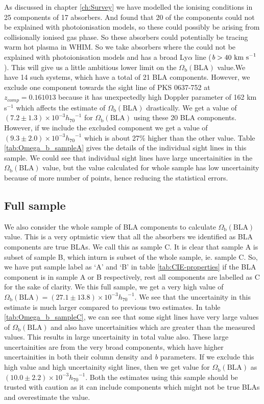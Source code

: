 As discussed in chapter \ref{ch:Survey} we have modelled the ionising conditions in 25 components of 17  absorbers. And found that 20 of the components could not be explained with photoionisation models, so these could possibly be arising from collisionally ionised gas phase. So these absorbers could potentially be tracing warm hot plasma in WHIM. So we take absorbers where the  could not be explained with photoionisation models and has a broad Ly$\alpha$ line ($\emph{b}>40 \ \text{km s}^{-1}$). This will give us a little ambitious lower limit on the $\Omega_\text{b}(\text{BLA})$ value.We have 14 such systems, which have a total of 21 BLA components. However, we exclude one component towards the sight line of PKS 0637-752 at $z_{comp}=0.161013$ because it has unexpectedly high Doppler parameter of 162 km s$^{-1}$ which affects the estimate of $\Omega_\text{b}(\text{BLA})$ drastically. We get a value of  $(7.2 \pm 1.3)\times 10^{-3} {h_{70}}^{-1}$ for $\Omega_\text{b}(\text{BLA})$ using these 20 BLA components. However, if we include the excluded component we get a value of $(9.3 \pm 2.0)\times 10^{-3} {h_{70}}^{-1}$ which is about 27\% higher than the other value. Table \ref{tab:Omega_b_sampleA} gives the details of the individual sight lines in this sample. We could see that individual sight lines have large uncertainities in the $\Omega_\text{b}(\text{BLA})$ value, but the value calculated for whole sample has low uncertainity because of more number of points, hence reducing the statistical errors. 


\subsection{Full sample} \label{sec:sampleC}

We also consider the whole sample of BLA components to calculate $\Omega_\text{b}(\text{BLA})$ value. This is a very optmistic view that all the absorbers we identified as BLA components are true BLAs. We call this as sample C. It is clear that sample A is subset of sample B, which inturn is subset of the whole sample, ie. sample C. So, we have put sample label as `A' and `B' in table \ref{tab:CIE-properties} if the BLA component is in sample A or B respectively, rest all components are labelled as C for the sake of clarity. We this full sample, we get a very high value of $\Omega_\text{b}(\text{BLA}) = (27.1 \pm 13.8)\times 10^{-3} {h_{70}}^{-1}$. We see that the uncertainity in this estimate is much larger compared to previous two estimates. In table \ref{tab:Omega_b_sampleC}, we can see that some sight lines have very large values of $\Omega_\text{b}(\text{BLA})$ and also have uncertainities which are greater than the measured values. This results in large uncertainity in total value also. These large uncertainities are from the very broad components, which have higher uncertainities in both their column density and \emph{b} parameters. If we exclude this high value and high uncertainity sight lines, then we get value for $\Omega_\text{b}(\text{BLA})$ as $(10.0 \pm 2.2)\times 10^{-3} {h_{70}}^{-1}$. Both  the estimates using this sample should be trusted with caution as it can include components which might not be true BLAs and overestimate the value.

